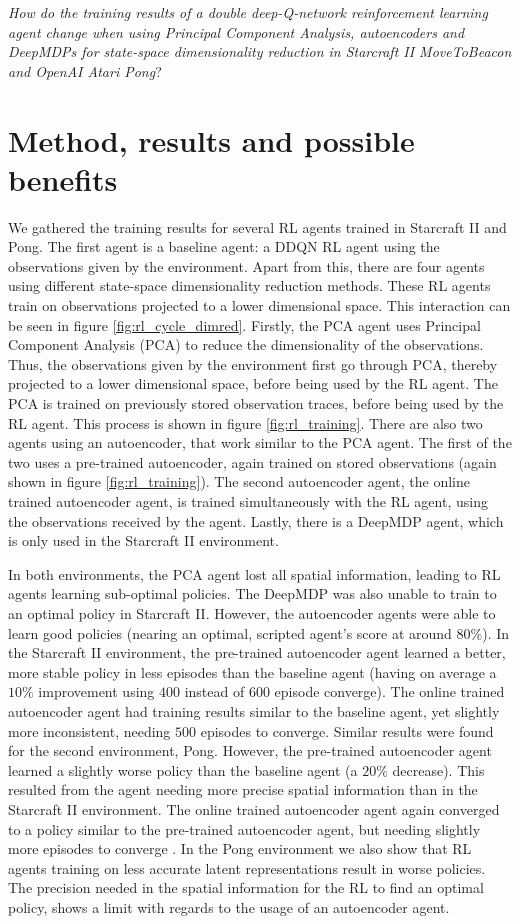 \noindent \textit{How do the training results of a double deep-Q-network reinforcement learning agent change when using Principal Component Analysis, autoencoders and DeepMDPs for state-space dimensionality reduction in Starcraft II MoveToBeacon and OpenAI Atari Pong}?

\section{Method, results and possible benefits}
We gathered the training results for several RL agents trained in Starcraft II and Pong. The first agent is a baseline agent: a DDQN RL agent using the observations given by the environment. Apart from this, there are four agents using different state-space dimensionality reduction methods. These RL agents train on observations projected to a lower dimensional space. This interaction can be seen in figure \ref{fig:rl_cycle_dimred}. Firstly, the PCA agent uses Principal Component Analysis (PCA) to reduce the dimensionality of the observations. Thus, the observations given by the environment first go through PCA, thereby projected to a lower dimensional space, before being used by the RL agent. The PCA is trained on previously stored observation traces, before being used by the RL agent. This process is shown in figure \ref{fig:rl_training}. There are also two agents using an autoencoder, that work similar to the PCA agent. The first of the two uses a pre-trained autoencoder, again trained on stored observations (again shown in figure \ref{fig:rl_training}). The second autoencoder agent, the online trained autoencoder agent, is trained simultaneously with the RL agent, using the observations received by the agent. Lastly, there is a DeepMDP agent, which is only used in the Starcraft II environment.

In both environments, the PCA agent lost all spatial information, leading to RL agents learning sub-optimal policies. The DeepMDP was also unable to train to an optimal policy in Starcraft II. However, the autoencoder agents were able to learn good policies (nearing an optimal, scripted agent's score at around $80\%$). In the Starcraft II environment, the pre-trained autoencoder agent learned a better, more stable policy in less episodes than the baseline agent (having on average a $10\%$ improvement using $400$ instead of $600$ episode converge). The online trained autoencoder agent had training results similar to the baseline agent, yet slightly more inconsistent, needing $500$ episodes to converge. Similar results were found for the second environment, Pong. However, the pre-trained autoencoder agent learned a slightly worse policy than the baseline agent (a $20\%$ decrease). This resulted from the agent needing more precise spatial information than in the Starcraft II environment. The online trained autoencoder agent again converged to a policy similar to the pre-trained autoencoder agent, but needing slightly more episodes to converge . In the Pong environment we also show that RL agents training on less accurate latent representations result in worse policies. The precision needed in the spatial information for the RL to find an optimal policy, shows a limit with regards to the usage of an autoencoder agent.

